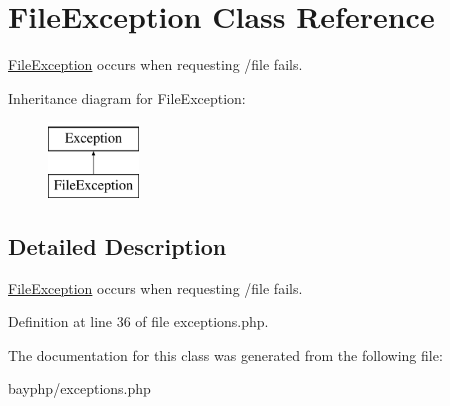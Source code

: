 \hypertarget{classFileException}{
\section{FileException Class Reference}
\label{classFileException}
}


\hyperlink{classFileException}{FileException} occurs when requesting /file fails.  


Inheritance diagram for FileException:\begin{figure}[H]
\begin{center}
\leavevmode
\includegraphics[height=2.000000cm]{classFileException}
\end{center}
\end{figure}


\subsection{Detailed Description}
\hyperlink{classFileException}{FileException} occurs when requesting /file fails. 

Definition at line 36 of file exceptions.php.



The documentation for this class was generated from the following file:\begin{DoxyCompactItemize}
\item 
bayphp/exceptions.php\end{DoxyCompactItemize}
